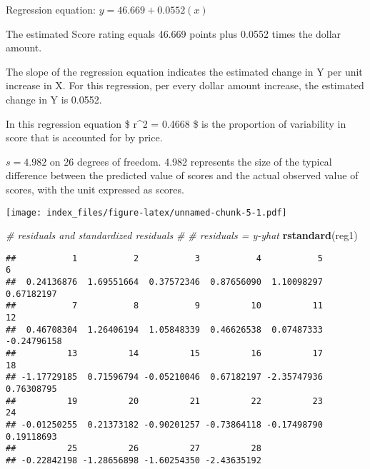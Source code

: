 \documentclass[
]{article}
\newenvironment{Shaded}{\begin{snugshade}}{\end{snugshade}}
\newcommand{\AttributeTok}[1]{\textcolor[rgb]{0.13,0.29,0.53}{#1}}
\newcommand{\CommentTok}[1]{\textcolor[rgb]{0.56,0.35,0.01}{\textit{#1}}}
\newcommand{\FunctionTok}[1]{\textcolor[rgb]{0.13,0.29,0.53}{\textbf{#1}}}
\newcommand{\NormalTok}[1]{#1}
\newcommand{\SpecialCharTok}[1]{\textcolor[rgb]{0.81,0.36,0.00}{\textbf{#1}}}
\newcommand{\StringTok}[1]{\textcolor[rgb]{0.31,0.60,0.02}{#1}}
\begin{document}
Regression equation: \(y = 46.669 + 0.0552(x)\)

The estimated Score rating equals 46.669 points plus 0.0552 times the
dollar amount.

The slope of the regression equation indicates the estimated change in Y
per unit increase in X. For this regression, per every dollar amount
increase, the estimated change in Y is 0.0552.

In this regression equation \$ r\^{}2 = 0.4668 \$ is the proportion of
variability in score that is accounted for by price.

\(s = 4.982\) on 26 degrees of freedom. 4.982 represents the size of the
typical difference between the predicted value of scores and the actual
observed value of scores, with the unit expressed as scores.

\begin{Shaded}
\end{Shaded}

\texttt{[image: index\_files/figure-latex/unnamed-chunk-5-1.pdf]}

\begin{Shaded}
\begin{Highlighting}[]
\CommentTok{\# residuals and standardized residuals}
\CommentTok{\# \# residuals = y{-}yhat}
\FunctionTok{rstandard}\NormalTok{(reg1) }
\end{Highlighting}
\end{Shaded}

\begin{verbatim}
##           1           2           3           4           5           6 
##  0.24136876  1.69551664  0.37572346  0.87656090  1.10098297  0.67182197 
##           7           8           9          10          11          12 
##  0.46708304  1.26406194  1.05848339  0.46626538  0.07487333 -0.24796158 
##          13          14          15          16          17          18 
## -1.17729185  0.71596794 -0.05210046  0.67182197 -2.35747936  0.76308795 
##          19          20          21          22          23          24 
## -0.01250255  0.21373182 -0.90201257 -0.73864118 -0.17498790  0.19118693 
##          25          26          27          28 
## -0.22842198 -1.28656898 -1.60254350 -2.43635192
\end{verbatim}
\end{document}

